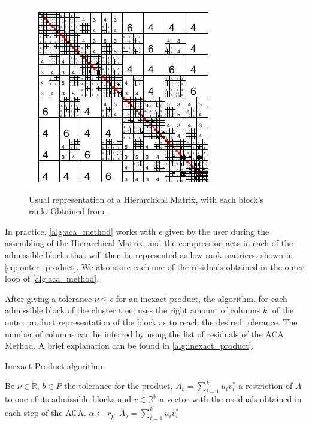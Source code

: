 
\begin{figure}[h!]
    \centering 
    \includegraphics[width=0.4\linewidth]{images/hmatrix_bebendorf.png}
    \caption{Usual representation of a Hierarchical Matrix, with each block's rank. Obtained from \cite{bebendorf2008hierarchical}.}
\end{figure}

In practice, \ref{alg:aca_method} works with $\epsilon$ given by the user during the assembling of the Hierarchical Matrix, and the compression acts in each of the admissible blocks that will then be represented as low rank matrices, shown in \ref{eq::outer_product}. We also store each one of the residuals obtained in the outer loop of \ref{alg:aca_method}.

After giving a tolerance $\nu  \leq \epsilon$ for an inexact product, the algorithm, for each admissible block of the cluster tree, uses the right amount of columns $k^{'}$ of the outer product representation of the block as to reach the desired tolerance. The number of columns can be inferred by using the list of residuals of the ACA Method. A brief explanation can be found in \ref{alg:inexact_product}.

\begin{algorithm}
    \caption{Inexact Product algorithm.}\label{alg:inexact_product}
    \begin{algorithmic}[1]
        \State Be $\nu \in \mathbb{R}$, $b \in P$ the tolerance for the product,  $A_{b}= \sum_{i=1}^{k}u_{i}v_{i}^{*}$ a restriction of $A$ to one of its admissible blocks and $r \in \mathbb{R^{k}}$ a vector with the residuals obtained in each step of the ACA.
        \State $\alpha \leftarrow r_{k^{'}}$
        \If{$\alpha \leq \nu$}
        \State $\tilde{A_{b}}=\sum_{i=1}^{k^{'}}u_{i}v_{i}^{*}$
        \EndIf
        \EndFor

    \end{algorithmic}
\end{algorithm}

